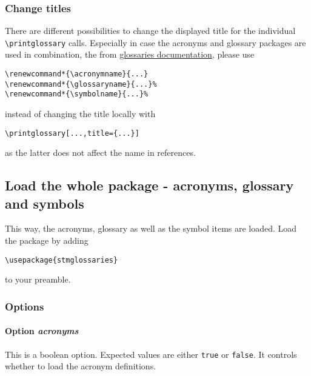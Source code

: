 \documentclass[%
  type=article,%
  layout=koma,%
  hyperref=true,%
  conditionallox=true,%
  conditionalloxnewpage=false,%
  date=true,%
  index=true,%
  listings=true%
]{stmtext}
\begin{document}
\subsubsection{Change titles}

There are different possibilities to change the displayed title for the individual \texttt{\textbackslash printglossary} calls. Especially in case the acronyms and glossary packages are used in combination, the from \href{http://ctan.space-pro.be/tex-archive/macros/latex/contrib/glossaries/glossaries-user.html#sec:fixednames}{glossaries documentation}, please use

\begin{verbatim}
\renewcommand*{\acronymname}{...}
\renewcommand*{\glossaryname}{...}%
\renewcommand*{\symbolname}{...}%
\end{verbatim}

instead of changing the title locally with

\begin{verbatim}
\printglossary[...,title={...}]
\end{verbatim}

as the latter does not affect the name in references.

\subsection{Load the whole package - acronyms, glossary and symbols}
\label{sec:usage:preamble:wholepackage}

This way, the acronyms, glossary as well as the symbol items are loaded. Load the package by adding

\begin{verbatim}
\usepackage{stmglossaries}
\end{verbatim}

to your preamble.

\subsubsection{Options}
\label{sec:usage:preamble:wholepackage:options}

\paragraph{Option \protect\textit{acronyms}}
\label{sec:usage:preamble:wholepackage:options:acronyms}

This is a boolean option. Expected values are either \texttt{true} or \texttt{false}. It controls whether to load the acronym definitions.
\end{document}
